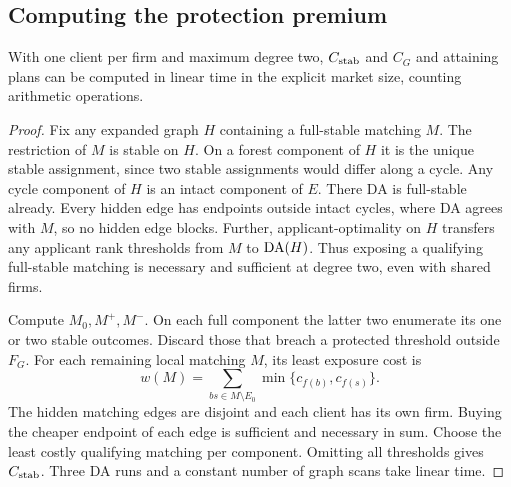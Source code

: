 \subsection{Computing the protection premium}
\begin{theorem}\label{thm:linear}
With one client per firm and maximum degree two, $C_{\mathrm{stab}}$ and $C_G$ and attaining plans can be computed in linear time in the explicit market size, counting arithmetic operations.
\end{theorem}
\begin{proof}
Fix any expanded graph $H$ containing a full-stable matching $M$. The restriction of $M$ is stable on $H$. On a forest component of $H$ it is the unique stable assignment, since two stable assignments would differ along a cycle. Any cycle component of $H$ is an intact component of $E$. There DA is full-stable already. Every hidden edge has endpoints outside intact cycles, where DA agrees with $M$, so no hidden edge blocks. Further, applicant-optimality on $H$ transfers any applicant rank thresholds from $M$ to $\operatorname{DA}(H)$. Thus exposing a qualifying full-stable matching is necessary and sufficient at degree two, even with shared firms.

Compute $M_0,M^+,M^-$. On each full component the latter two enumerate its one or two stable outcomes. Discard those that breach a protected threshold outside $F_G$. For each remaining local matching $M$, its least exposure cost is
\[
       w(M)=\sum_{bs\in M\setminus E_0}\min\{c_{f(b)},c_{f(s)}\}.
\]
The hidden matching edges are disjoint and each client has its own firm. Buying the cheaper endpoint of each edge is sufficient and necessary in sum. Choose the least costly qualifying matching per component. Omitting all thresholds gives $C_{\mathrm{stab}}$. Three DA runs and a constant number of graph scans take linear time.
\end{proof}

